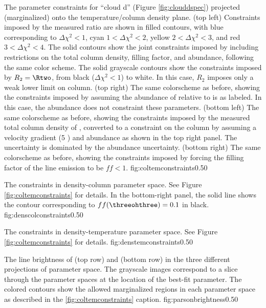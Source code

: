 {The parameter constraints for ``cloud d'' (Figure \ref{fig:clouddspec})
projected (marginalized) onto the temperature/column density plane.\newline
(top left) Constraints imposed by the measured ratio \Rone are shown in filled contours,
with blue corresponding to $\Delta\chi^2 < 1$, cyan $1 < \Delta\chi^2 < 2$,
yellow $2 < \Delta\chi^2 < 3$, and red $3 < \Delta\chi^2 < 4$.  The solid
contours show the joint constraints imposed by including restrictions on the
total column density, filling factor, and abundance, following the same color
scheme.  The solid grayscale contours show the constraints imposed by
$R_2=\Rtwo$, from black ($\Delta\chi^2 < 1$) to white.  In this case, $R_2$
imposes only a weak lower limit on column. \newline
(top right) The same colorscheme as before, showing the constraints imposed by
assuming the abundance of \para relative to \hh is as labeled.  In this case,
the abundance does not constraint these parameters. \newline
(bottom left) The same colorscheme as before, showing the constraints imposed
by the measured total column density of \hh, converted to a constraint on the
\para column by assuming a velocity gradient (5 \kms \perpc) and abundance as
shown in the top right panel.  The uncertainty is dominated by the abundance
uncertainty.  \newline
(bottom right) The same colorscheme as before, showing the constraints imposed
by forcing the filling factor of the line emission to be $ff < 1$.
}
{fig:coltemconstraints}{0.5}{0}

{The constraints in density-column parameter space.
See Figure \ref{fig:coltemconstraints} for details.  In the bottom-right panel, the
solid line shows the contour corresponding to $ff(\threeohthree)=0.1$ in
black.}
{fig:denscolconstraints}{0.5}{0}

{The constraints in density-temperature parameter space.
See Figure \ref{fig:coltemconstraints} for details.}
{fig:denstemconstraints}{0.5}{0}

{The line brightness of \para \threeohthree (top row) and \para \threetwoone
(bottom row) in the three different projections of parameter space.  The
grayscale images correspond to a slice through the parameter spaces at the
location of the best-fit parameter.  The colored contours show the allowed
marginalized regions in each parameter space as described in the
\ref{fig:coltemconstraints} caption.}
{fig:parsonbrightness}{0.5}{0}

